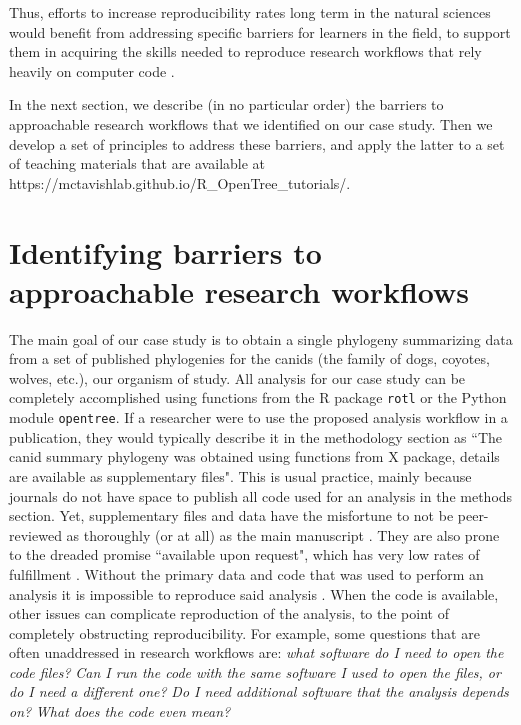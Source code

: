 \documentclass[12pt]{article}
\begin{document}
Thus, efforts to increase reproducibility rates long term in the natural sciences would benefit from addressing specific barriers for learners in the field, to support them in acquiring the skills needed to reproduce research workflows that rely heavily on computer code \citep{peng2011reproducible, sandve2013ten, powers2019open}.

In the next section, we describe (in no particular order) the barriers to approachable research workflows that we identified on our case study.
Then we develop a set of principles to address these barriers, and apply the latter to a set of teaching materials that are available at https://mctavishlab.github.io/R\_OpenTree\_tutorials/.


\section*{Identifying barriers to approachable research workflows}
\label{sec:identifying}


The main goal of our case study is to obtain a single phylogeny summarizing data from a set of published phylogenies for the canids (the family of dogs, coyotes, wolves, etc.), our organism of study.
All analysis for our case study can be completely accomplished using functions from the R package \texttt{rotl} or the Python module \texttt{opentree}.
If a researcher were to use the proposed analysis workflow in a publication, they would typically describe it in the methodology section as ``The canid summary phylogeny was obtained using functions from X package, details are available as supplementary files".
This is usual practice, mainly because journals do not have space to publish all code used for an analysis in the methods section. Yet, supplementary files and data have the misfortune to not be peer-reviewed as thoroughly (or at all) as the main manuscript \citep{pop2015use}.
They are also prone to the dreaded promise ``available upon request", which has very low rates of fulfillment \citep{krawczyk2012available}.
Without the primary data and code that was used to perform an analysis it is impossible to reproduce said analysis \citep{miyakawa2020no}. When the code is available, other issues can complicate reproduction of the analysis, to the point of completely obstructing reproducibility.
For example, some questions that are often unaddressed in research workflows are:
\textit{what software do I need to open the code files?}
\textit{Can I run the code with the same software I used to open the files, or do I need a different one?}
\textit{Do I need additional software that the analysis depends on?}
\textit{What does the code even mean?}
\end{document}
